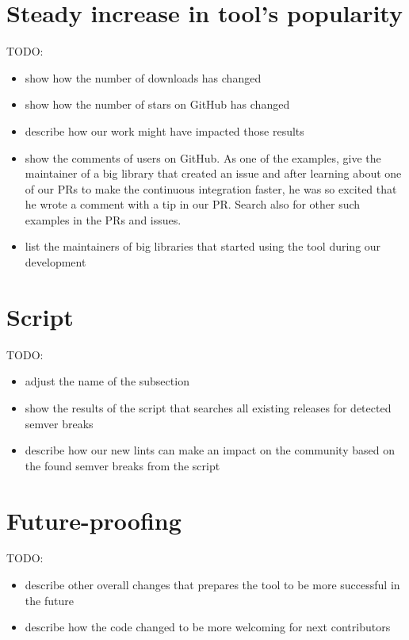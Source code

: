 \documentclass[licencjacka,en]{pracamgr}
\begin{document}
\section{Steady increase in tool's popularity}

TODO:
\begin{itemize}
	\item show how the number of downloads has changed
	\item show how the number of stars on GitHub has changed
	\item describe how our work might have impacted those results
	\item show the comments of users on GitHub.
		As one of the examples, give the maintainer of a big
		library that created an issue 
		and after learning about one of our PRs to make the continuous integration faster,
		he was so excited that he wrote a comment with a tip in our PR.
		Search also for other such examples in the PRs and issues.
	\item list the maintainers of big libraries that started using the tool during our development
\end{itemize}

\section{Script} \label{r:section_scanning_script}

TODO:
\begin{itemize}
        \item adjust the name of the subsection
        \item show the results of the script that searches all existing releases for detected semver breaks
	\item describe how our new lints can make an impact on the community based on the found semver breaks from the script
\end{itemize}

\section{Future-proofing}

TODO:
\begin{itemize}
	\item describe other overall changes that prepares the tool to be more successful in the future
	\item describe how the code changed to be more welcoming for next contributors
\end{itemize}
\end{document}
